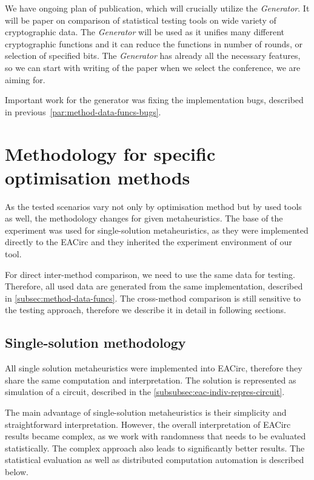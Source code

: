 \documentclass[
  print, %
  Table,   %
  nolof,     %
  nolot,     %
  11pt, %
  oneside  %
]{fithesis3}
\begin{document}
We have ongoing plan of publication, which will crucially utilize the \textit{Generator}. It will be paper on comparison of statistical testing tools on wide variety of cryptographic data. The \textit{Generator} will be used as it unifies many different cryptographic functions and it can reduce the functions in number of rounds, or selection of specified bits. The \textit{Generator} has already all the necessary features, so we can start with writing of the paper when we select the conference, we are aiming for.

Important work for the generator was fixing the implementation bugs, described in previous~\cref{par:method-data-funcs-bugs}.


\section{Methodology for specific optimisation methods}
\label{sec:method-spec}

As the tested scenarios vary not only by optimisation method but by used tools as well, the methodology changes for given metaheuristics. The base of the experiment was used for single-solution metaheuristics, as they were implemented directly to the EACirc and they inherited the experiment environment of our tool.

For direct inter-method comparison, we need to use the same data for testing. Therefore, all used data are generated from the same implementation, described in \cref{subsec:method-data-funcs}. The cross-method comparison is still sensitive to the testing approach, therefore we describe it in detail in following sections.


\subsection{Single-solution methodology}
\label{subsec:method-spec-ss}

All single solution metaheuristics were implemented into EACirc, therefore they share the same computation and interpretation. The solution is represented as simulation of a circuit, described in the \cref{subsubsec:eac-indiv-repres-circuit}.

The main advantage of single-solution metaheuristics is their simplicity and straightforward interpretation. However, the overall interpretation of EACirc results became complex, as we work with randomness that needs to be evaluated statistically. The complex approach also leads to significantly better results. The statistical evaluation as well as distributed computation automation is described below.
\end{document}
